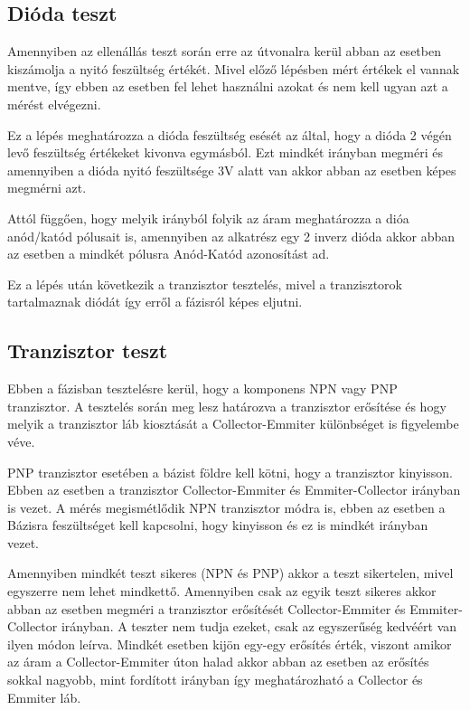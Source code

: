 \subsection{Dióda teszt}

Amennyiben az ellenállás teszt során erre az útvonalra kerül
abban az esetben kiszámolja a nyitó feszültség értékét.
Mivel előző lépésben mért értékek el vannak mentve, így ebben 
az esetben fel lehet használni azokat és nem kell ugyan azt a 
mérést elvégezni.

Ez a lépés meghatározza a dióda feszültség esését az által, hogy a 
dióda 2 végén levő feszültség értékeket kivonva egymásból.
Ezt mindkét irányban megméri és amennyiben a dióda nyitó
feszültsége 3V alatt van akkor abban az esetben képes megmérni azt.

Attól függően, hogy melyik irányból folyik az áram meghatározza
a dióa anód/katód pólusait is, amennyiben az alkatrész egy 
2 inverz dióda akkor abban az esetben a mindkét pólusra 
Anód-Katód azonosítást ad.

Ez a lépés után következik a tranzisztor tesztelés, mivel a
tranzisztorok tartalmaznak diódát így erről a fázisról képes eljutni.

\subsection{Tranzisztor teszt}

Ebben a fázisban tesztelésre kerül, hogy a komponens NPN vagy PNP tranzisztor.
A tesztelés során meg lesz határozva a tranzisztor erősítése és hogy 
melyik a tranzisztor láb kiosztását a Collector-Emmiter különbséget is figyelembe
véve.

PNP tranzisztor esetében a bázist földre kell kötni, hogy a tranzisztor kinyisson.
Ebben az esetben a tranzisztor Collector-Emmiter és Emmiter-Collector irányban
is vezet. A mérés megismétlődik NPN tranzisztor módra is, ebben az esetben 
a Bázisra feszültséget kell kapcsolni, hogy kinyisson és ez is mindkét irányban
vezet.

Amennyiben mindkét teszt sikeres (NPN és PNP) akkor a teszt sikertelen, mivel
egyszerre nem lehet mindkettő. Amennyiben csak az egyik teszt sikeres akkor
abban az esetben megméri a tranzisztor erősítését Collector-Emmiter és 
Emmiter-Collector irányban. A teszter nem tudja ezeket, csak az egyszerűség
kedvéért van ilyen módon leírva. Mindkét esetben kijön egy-egy erősítés érték,
viszont amikor az áram a Collector-Emmiter úton halad akkor abban az esetben
az erősítés sokkal nagyobb, mint fordított irányban így meghatározható a 
Collector és Emmiter láb.

